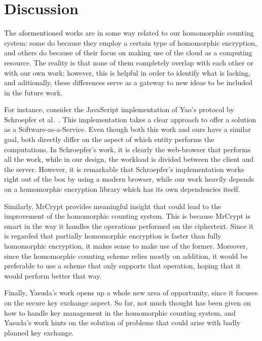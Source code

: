\section{Discussion}

The aformentioned works are in some way related to our homomorphic counting system: some do because they employ a certain type of homomorphic encryption, and others do because of their focus on making use of the cloud as a computing resource. The reality is that none of them completely overlap with each other or with our own work; however, this is helpful in order to identify what is lacking, and aditionally, these differences serve as a gateway to new ideas to be included in the future work.

For instance, consider the JavaScript implementation of Yao's protocol \cite{Yao:1986:GES:1382439.1382944} by Schroepfer et al.\ \cite{Schroepfer:2011:DSC:2046707.2093509}. This implementation takes a clear approach to offer a solution as a Software-as-a-Service. Even though both this work and ours have a similar goal, both directly differ on the aspect of which entity performs the computations. In Schroepfer's work, it is clearly the web-browser that performs all the work, while in our design, the workload is divided between the client and the server. However, it is remarkable that Schroepfer's implementation works right out of the box by using a modern browser, while our work heavily depends on a homomorphic encryption library which has its own dependencies itself.

Similarly, MrCrypt \cite{Tetali:2013:MSA:2544173.2509554} provides meaningful insight that could lead to the improvement of the homomorphic counting system. This is because MrCrypt is smart in the way it handles the operations performed on the ciphertext. Since it is regarded that partially homomorphic encryption is faster than fully homomorphic encryption, it makes sense to make use of the former. Moreover, since the homomorphic counting scheme relies mostly on addition, it would be preferable to use a scheme that only supports that operation, hoping that it would perform better that way.

Finally, Yasuda's \cite{Yasuda:2015:SDD:2732516.2732521} work opens up a whole new area of opportunity, since it focuses on the secure key exchange aspect. So far, not much thought has been given on how to handle key management in the homomorphic counting system, and Yasuda's work hints on the solution of problems that could arise with badly planned key exchange.

